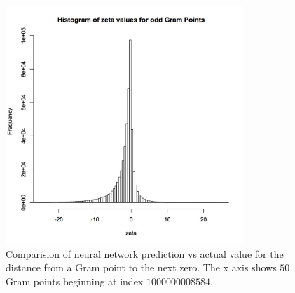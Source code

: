 \documentclass[twoside]{article}
\begin{document}
\begin{figure}
\centering
\includegraphics[width=0.8\textwidth]{ozeta.jpg}
\caption[]{ 
 Comparision of neural network prediction vs actual value
 for the distance from a Gram point to the next zero.
 The x axis shows $50$ Gram points beginning at index $1000000008584$.
 }
\label{NextZero}
\end{figure}
\end{document}
